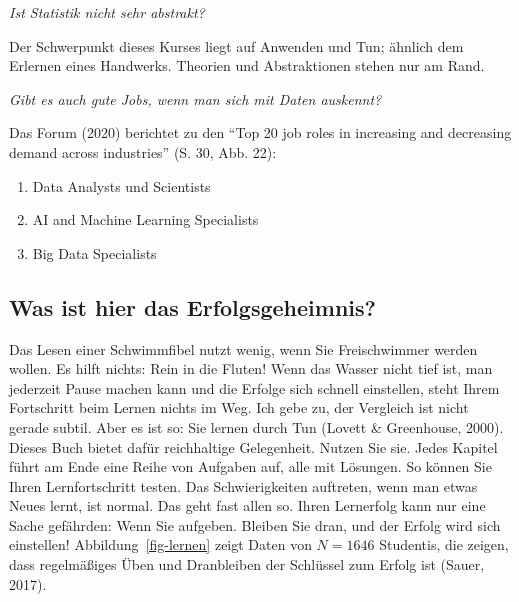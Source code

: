 \documentclass[
  letterpaper,
]{scrbook}
\providecommand{\tightlist}{%
  \setlength{\itemsep}{0pt}\setlength{\parskip}{0pt}}\usepackage{longtable,booktabs,array}
\theoremstyle{definition}
\theoremstyle{definition}
\theoremstyle{definition}
\theoremstyle{remark}
\begin{document}
\emph{Ist Statistik nicht sehr abstrakt?}

Der Schwerpunkt dieses Kurses liegt auf Anwenden und Tun; ähnlich dem
Erlernen eines Handwerks. Theorien und Abstraktionen stehen nur am Rand.

\emph{Gibt es auch gute Jobs, wenn man sich mit Daten auskennt?}

Das Forum (2020) berichtet zu den \enquote{Top 20 job roles in
increasing and decreasing demand across industries} (S. 30, Abb. 22):

\begin{enumerate}
\def\labelenumi{\arabic{enumi}.}
\tightlist
\item
  Data Analysts und Scientists
\item
  AI and Machine Learning Specialists
\item
  Big Data Specialists
\end{enumerate}

\subsection{Was ist hier das
Erfolgsgeheimnis?}\label{was-ist-hier-das-erfolgsgeheimnis}

Das Lesen einer Schwimmfibel nutzt wenig, wenn Sie Freischwimmer werden
wollen. Es hilft nichts: Rein in die Fluten! Wenn das Wasser nicht tief
ist, man jederzeit Pause machen kann und die Erfolge sich schnell
einstellen, steht Ihrem Fortschritt beim Lernen nichts im Weg. Ich gebe
zu, der Vergleich ist nicht gerade subtil. Aber es ist so: Sie lernen
durch Tun (Lovett \& Greenhouse, 2000). Dieses Buch bietet dafür
reichhaltige Gelegenheit. Nutzen Sie sie. Jedes Kapitel führt am Ende
eine Reihe von Aufgaben auf, alle mit Lösungen. So können Sie Ihren
Lernfortschritt testen. Das Schwierigkeiten auftreten, wenn man etwas
Neues lernt, ist normal. Das geht fast allen so. Ihren Lernerfolg kann
nur eine Sache gefährden: Wenn Sie aufgeben. Bleiben Sie dran, und der
Erfolg wird sich einstellen! Abbildung~\ref{fig-lernen} zeigt Daten von
\(N=1646\) Studentis, die zeigen, dass regelmäßiges Üben und Dranbleiben
der Schlüssel zum Erfolg ist (Sauer, 2017).
\end{document}
